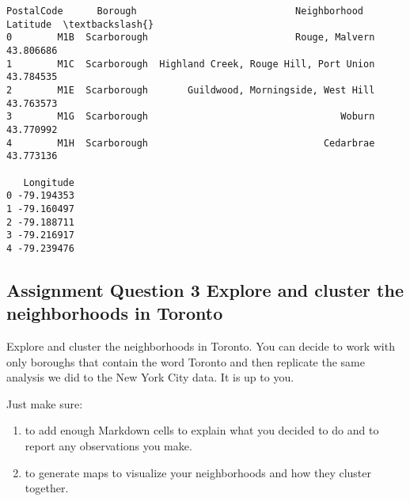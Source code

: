 \documentclass[11pt]{article}
\makeatletter
\providecommand{\tightlist}{%
      \setlength{\itemsep}{0pt}\setlength{\parskip}{0pt}}
\newcommand{\boxspacing}{\kern\kvtcb@left@rule\kern\kvtcb@boxsep}
\newcommand{\prompt}[4]{
        \ttfamily\llap{{\color{#2}[#3]:\hspace{3pt}#4}}\vspace{-\baselineskip}
    }
\makeatother
\begin{document}
            \begin{tcolorbox}[breakable, size=fbox, boxrule=.5pt, pad at break*=1mm, opacityfill=0]
\prompt{Out}{outcolor}{18}{\boxspacing}
\begin{Verbatim}[commandchars=\\\{\}]
  PostalCode      Borough                            Neighborhood   Latitude  \textbackslash{}
0        M1B  Scarborough                          Rouge, Malvern  43.806686
1        M1C  Scarborough  Highland Creek, Rouge Hill, Port Union  43.784535
2        M1E  Scarborough       Guildwood, Morningside, West Hill  43.763573
3        M1G  Scarborough                                  Woburn  43.770992
4        M1H  Scarborough                               Cedarbrae  43.773136

   Longitude
0 -79.194353
1 -79.160497
2 -79.188711
3 -79.216917
4 -79.239476
\end{Verbatim}
\end{tcolorbox}
        
    \hypertarget{assignment-question-3-explore-and-cluster-the-neighborhoods-in-toronto}{%
\subsection{Assignment Question 3 Explore and cluster the neighborhoods
in
Toronto}\label{assignment-question-3-explore-and-cluster-the-neighborhoods-in-toronto}}

Explore and cluster the neighborhoods in Toronto. You can decide to work
with only boroughs that contain the word Toronto and then replicate the
same analysis we did to the New York City data. It is up to you.

Just make sure:

\begin{enumerate}
\def\labelenumi{\arabic{enumi}.}
\tightlist
\item
  to add enough Markdown cells to explain what you decided to do and to
  report any observations you make.
\item
  to generate maps to visualize your neighborhoods and how they cluster
  together.
\end{enumerate}
\end{document}
